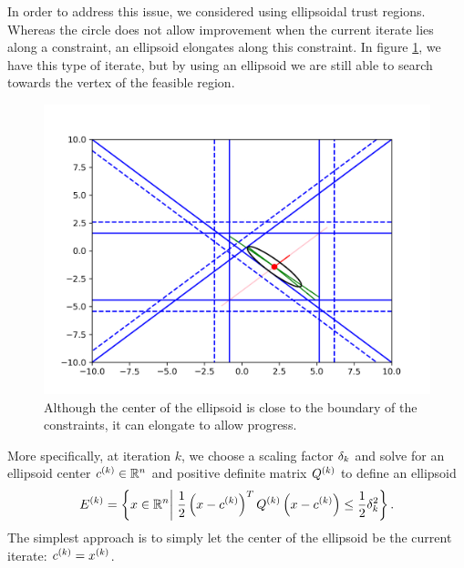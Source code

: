 In order to address this issue, we considered using ellipsoidal trust regions.
Whereas the circle does not allow improvement when the current iterate lies along a constraint, an ellipsoid elongates along this constraint.
In figure \cref{ellipse_adv}, we have this type of iterate, but by using an ellipsoid we are still able to search towards the vertex of the feasible region.
\begin{figure}[ht]
    \centering
    \includegraphics[scale=0.4]{images/advantage_of_ellipse_2.png}
    \caption[An ellipsoidal trust region allows for more progress than a circular trust region.] {
    	Although the center of the ellipsoid is close to the boundary of the constraints, it can elongate to allow progress.
    }
    \label{ellipse_adv}
\end{figure}


More specifically, at iteration $k$, we choose a scaling factor $\delta_k$ and solve for an ellipsoid center $c^{(k)} \in \mathbb R^n$ and positive definite matrix ${Q^{(k)}}$ to define an ellipsoid
\begin{align*}
{E^{(k)}} = \left\{x \in \mathbb R^n \bigg| \; \frac 1 2 \left(x - c^{(k)}\right)^T{Q^{(k)}}\left(x - c^{(k)}\right) \le \frac 1 2 \delta_k^2 \right\}.
\end{align*}
The simplest approach is to simply let the center of the ellipsoid be the current iterate: $c^{(k)} = x^{(k)}$.









